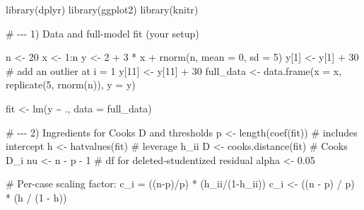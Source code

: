 \documentclass[
  letterpaper,
  DIV=11,
  numbers=noendperiod]{scrreprt}
\newenvironment{Shaded}{\begin{snugshade}}{\end{snugshade}}
\newcommand{\AttributeTok}[1]{\textcolor[rgb]{0.40,0.45,0.13}{#1}}
\newcommand{\CommentTok}[1]{\textcolor[rgb]{0.37,0.37,0.37}{#1}}
\newcommand{\DecValTok}[1]{\textcolor[rgb]{0.68,0.00,0.00}{#1}}
\newcommand{\FloatTok}[1]{\textcolor[rgb]{0.68,0.00,0.00}{#1}}
\newcommand{\FunctionTok}[1]{\textcolor[rgb]{0.28,0.35,0.67}{#1}}
\newcommand{\NormalTok}[1]{\textcolor[rgb]{0.00,0.23,0.31}{#1}}
\newcommand{\OtherTok}[1]{\textcolor[rgb]{0.00,0.23,0.31}{#1}}
\newcommand{\SpecialCharTok}[1]{\textcolor[rgb]{0.37,0.37,0.37}{#1}}
\begin{document}
\begin{Shaded}
\begin{Highlighting}[]
\FunctionTok{library}\NormalTok{(dplyr)}
\FunctionTok{library}\NormalTok{(ggplot2)}
\FunctionTok{library}\NormalTok{(knitr)}

\CommentTok{\# {-}{-}{-} 1) Data and full{-}model fit (your setup)}

\NormalTok{n }\OtherTok{\textless{}{-}} \DecValTok{20}
\NormalTok{x }\OtherTok{\textless{}{-}} \DecValTok{1}\SpecialCharTok{:}\NormalTok{n}
\NormalTok{y }\OtherTok{\textless{}{-}} \DecValTok{2} \SpecialCharTok{+} \DecValTok{3} \SpecialCharTok{*}\NormalTok{ x }\SpecialCharTok{+} \FunctionTok{rnorm}\NormalTok{(n, }\AttributeTok{mean =} \DecValTok{0}\NormalTok{, }\AttributeTok{sd =} \DecValTok{5}\NormalTok{)}
\NormalTok{y[}\DecValTok{1}\NormalTok{] }\OtherTok{\textless{}{-}}\NormalTok{ y[}\DecValTok{1}\NormalTok{] }\SpecialCharTok{+} \DecValTok{30}   \CommentTok{\# add an outlier at i = 1}
\NormalTok{y[}\DecValTok{11}\NormalTok{] }\OtherTok{\textless{}{-}}\NormalTok{ y[}\DecValTok{11}\NormalTok{] }\SpecialCharTok{+} \DecValTok{30}
\NormalTok{full\_data  }\OtherTok{\textless{}{-}} \FunctionTok{data.frame}\NormalTok{(}\AttributeTok{x =}\NormalTok{ x, }\FunctionTok{replicate}\NormalTok{(}\DecValTok{5}\NormalTok{, }\FunctionTok{rnorm}\NormalTok{(n)), }\AttributeTok{y =}\NormalTok{ y)}

\NormalTok{fit }\OtherTok{\textless{}{-}} \FunctionTok{lm}\NormalTok{(y }\SpecialCharTok{\textasciitilde{}}\NormalTok{ ., }\AttributeTok{data =}\NormalTok{ full\_data)}

\CommentTok{\# {-}{-}{-} 2) Ingredients for Cook\textquotesingle{}s D and thresholds}
\NormalTok{p      }\OtherTok{\textless{}{-}} \FunctionTok{length}\NormalTok{(}\FunctionTok{coef}\NormalTok{(fit))        }\CommentTok{\# includes intercept}
\NormalTok{h      }\OtherTok{\textless{}{-}} \FunctionTok{hatvalues}\NormalTok{(fit)           }\CommentTok{\# leverage h\_ii}
\NormalTok{D      }\OtherTok{\textless{}{-}} \FunctionTok{cooks.distance}\NormalTok{(fit)      }\CommentTok{\# Cook\textquotesingle{}s D\_i}
\NormalTok{nu     }\OtherTok{\textless{}{-}}\NormalTok{ n }\SpecialCharTok{{-}}\NormalTok{ p }\SpecialCharTok{{-}} \DecValTok{1}                \CommentTok{\# df for deleted{-}studentized residual}
\NormalTok{alpha  }\OtherTok{\textless{}{-}} \FloatTok{0.05}

\CommentTok{\# Per{-}case scaling factor: c\_i = ((n{-}p)/p) * (h\_ii/(1{-}h\_ii))}
\NormalTok{c\_i        }\OtherTok{\textless{}{-}}\NormalTok{ ((n }\SpecialCharTok{{-}}\NormalTok{ p) }\SpecialCharTok{/}\NormalTok{ p) }\SpecialCharTok{*}\NormalTok{ (h }\SpecialCharTok{/}\NormalTok{ (}\DecValTok{1} \SpecialCharTok{{-}}\NormalTok{ h))}


\end{Highlighting}
\end{Shaded}
\end{document}
